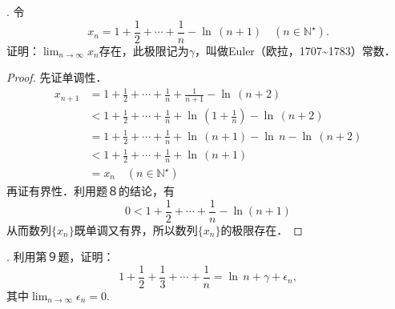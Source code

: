 . 令
\begin{equation}
    x_n = 1 + \frac{1}{2} + \cdots + \frac{1}{n} - \ln \, \left( n+1 \right) \quad (n \in \mathbb{N}^\star).
\end{equation}
证明：$\displaystyle \lim_{n \to \infty} x_n $存在，此极限记为$\gamma$，叫做Euler（欧拉，1707\textasciitilde 1783）常数．
\begin{proof}
先证单调性．
\begin{align}
    x_{n+1} &= 1 + \frac{1}{2} + \cdots + \frac{1}{n} + \frac{1}{n+1} - \ln \, \left(n+2\right) \\
    &< 1 + \frac{1}{2} + \cdots + \frac{1}{n} + \ln \, \left( 1 + \frac{1}{n} \right) - \ln \, \left( n+2\right) \\
    &= 1 + \frac{1}{2} + \cdots + \frac{1}{n} + \ln \, \left( n+1 \right) - \ln \, n - \ln \, \left( n+2 \right) \\
    &< 1 + \frac{1}{2} + \cdots + \frac{1}{n} + \ln \, \left( n+1 \right) \\
    &= x_n \quad (n \in \mathbb{N}^\star)
\end{align}
再证有界性．利用题８的结论，有
\begin{equation}
    0 < 1 + \frac{1}{2} + \cdots + \frac{1}{n} - \ln \left( n + 1\right) 
\end{equation}
从而数列$\{ x_n \}$既单调又有界，所以数列$\{ x_n \}$的极限存在．
\end{proof}
. 利用第９题，证明：
\begin{equation}
    1+\frac{1}{2} + \frac{1}{3} + \cdots + \frac{1}{n} = \ln \, n + \gamma + \epsilon_n,
\end{equation}
其中$\displaystyle \lim_{n \to \infty} \epsilon_n = 0$.
